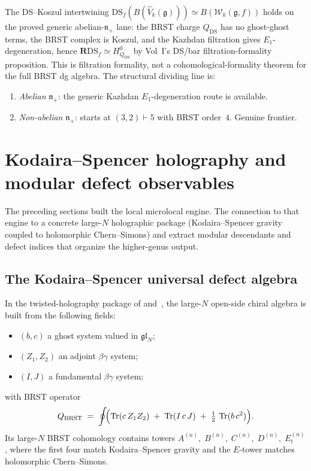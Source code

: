 \begin{construction}
The DS--Koszul intertwining $\mathrm{DS}_f(B(\hat{V}_k(\mathfrak{g}))) \simeq B(\mathcal{W}_k(\mathfrak{g}, f))$ holds on the proved generic abelian-$\mathfrak{n}_+$ lane: the BRST charge $Q_{\mathrm{DS}}$ has no ghost-ghost terms, the BRST complex is Koszul, and the Kazhdan filtration gives $E_1$-degeneration, hence $\mathbf{R}\mathrm{DS}_f \simeq H^0_{Q_{\mathrm{DS}}}$ by Vol~I's DS/bar filtration-formality proposition. This is filtration formality, not a cohomological-formality theorem for the full BRST dg algebra. The structural dividing line is:
\begin{enumerate}[label=\textup{(\roman*)}]
\item \emph{Abelian} $\mathfrak{n}_+$: the generic Kazhdan $E_1$-degeneration route is available.
\item \emph{Non-abelian} $\mathfrak{n}_+$: starts at $(3,2) \vdash 5$ with BRST order~$4$. Genuine frontier.
\end{enumerate}
\end{construction}

\section{Kodaira--Spencer holography and modular defect observables}

The preceding sections built the local microlocal engine.
The connection to that engine to a concrete large-$N$ holographic
package (Kodaira--Spencer gravity coupled to holomorphic
Chern--Simons) and extract modular descendants and defect indices
that organize the higher-genus output.

\subsection{The Kodaira--Spencer universal defect algebra}

\begin{example}
In the twisted-holography package of \cite{Zeng23} and~\cite{KZ25},
the large-$N$ open-side chiral algebra is built from the following
fields:
\begin{itemize}[leftmargin=1.8em]
\item $(b,c)$ a ghost system valued in $\mathfrak{gl}_N$;
\item $(Z_1,Z_2)$ an adjoint $\beta\gamma$ system;
\item $(I,J)$ a fundamental $\beta\gamma$ system;
\end{itemize}
with BRST operator
\[
Q_{\mathrm{BRST}}
\;=\;
\oint\!\Bigl(\operatorname{Tr}(c\,Z_1 Z_2)
 \;+\;\operatorname{Tr}(I\,c\,J)
 \;+\;\tfrac{1}{2}\,\operatorname{Tr}(b\,c^2)\Bigr).
\]
Its large-$N$ BRST cohomology contains towers
$A^{(n)},\;B^{(n)},\;C^{(n)},\;D^{(n)},\;E_t^{(n)}$,
where the first four match Kodaira--Spencer gravity and the
$E$-tower matches holomorphic Chern--Simons.
\end{example}

